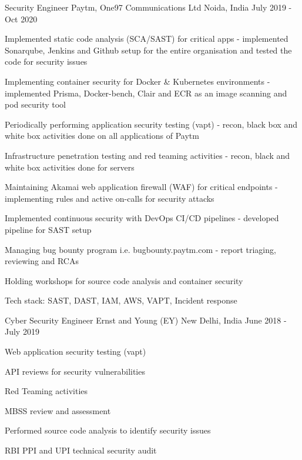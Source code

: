 \begin{cventries}
  \cventry
    {Security Engineer} %
    {Paytm, One97 Communications Ltd} %
    {Noida, India} %
    {July 2019 - Oct 2020} %
    {
      \begin{cvitems} %
        \item {Implemented static code analysis (SCA/SAST) for critical apps - implemented Sonarqube, Jenkins and Github setup for the entire organisation and tested the code for security issues}
        \item {Implementing container security for Docker \& Kubernetes environments - implemented Prisma, Docker-bench, Clair and ECR as an image scanning and pod security tool}
        \item {Periodically performing application security testing (vapt) - recon, black box and white box activities done on all applications of Paytm}
        \item {Infrastructure penetration testing and red teaming activities - recon, black and white box activities done for servers}
        \item {Maintaining Akamai web application firewall (WAF) for critical endpoints - implementing rules and active on-calls for security attacks}
        \item {Implemented continuous security with DevOps CI/CD pipelines - developed pipeline for SAST setup}
        \item {Managing bug bounty program i.e. bugbounty.paytm.com - report triaging, reviewing and RCAs}
        \item {Holding workshops for source code analysis and container security}
        \item {Tech stack: SAST, DAST, IAM, AWS, VAPT, Incident response}
      \end{cvitems}
    }

  \cventry
    {Cyber Security Engineer} %
    {Ernst and Young (EY)} %
    {New Delhi, India} %
    {June 2018 - July 2019} %
    {
      \begin{cvitems} %
        \item {Web application security testing (vapt)}
        \item {API reviews for security vulnerabilities}
        \item {Red Teaming activities}
        \item {MBSS review and assessment}
        \item {Performed source code analysis to identify security issues}
        \item {RBI PPI and UPI technical security audit}
      \end{cvitems}
    }

\end{cventries}
